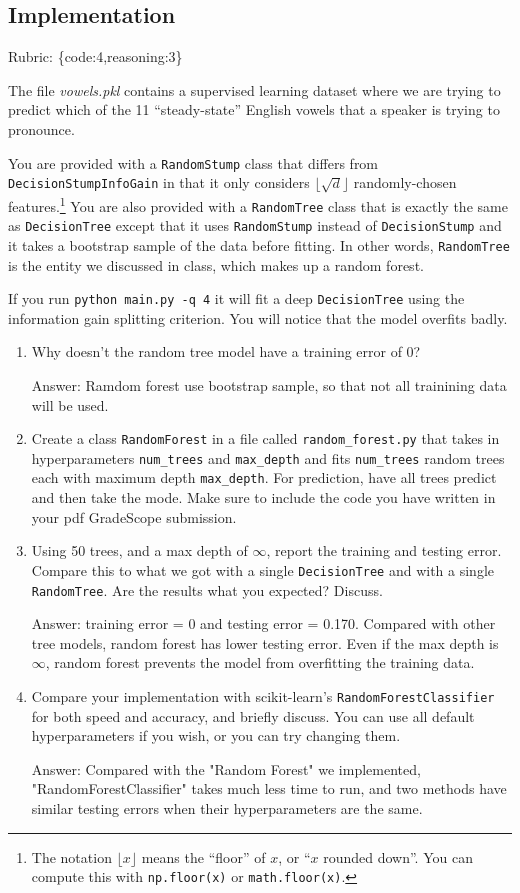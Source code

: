 \documentclass{article}
\def\rubric#1{\gre{Rubric: \{#1\}}}{}
\def\ans#1{\par\gre{Answer: #1}}
\def\blu#1{{\color{blu}#1}}
\def\gre#1{{\color{gre}#1}}
\def\enum#1{\begin{enumerate}#1\end{enumerate}}
\begin{document}
\subsection{Implementation}
\rubric{code:4,reasoning:3}

The file \emph{vowels.pkl} contains a supervised learning dataset where we are trying to predict which of the 11 ``steady-state'' English vowels that a speaker is trying to pronounce.

You are provided with a \texttt{RandomStump} class that differs from
\texttt{DecisionStumpInfoGain} in that
it only considers $\lfloor \sqrt{d} \rfloor$ randomly-chosen features.\footnote{The notation $\lfloor x\rfloor$ means the ``floor'' of $x$, or ``$x$ rounded down''. You can compute this with \texttt{np.floor(x)} or \texttt{math.floor(x)}.}
You are also provided with a \texttt{RandomTree} class that is exactly the same as
\texttt{DecisionTree} except that it uses \texttt{RandomStump} instead of
\texttt{DecisionStump} and it takes a bootstrap sample of the data before fitting.
In other words, \texttt{RandomTree} is the entity we discussed in class, which
makes up a random forest.

If you run \texttt{python main.py -q 4} it will fit a deep \texttt{DecisionTree}
using the information gain splitting criterion. You will notice that the model overfits badly.




\blu{
\enum{
\item Why doesn't the random tree model have a training error of 0?
\ans{Ramdom forest use bootstrap sample, so that not all trainining data will be used.}
\item Create a class \texttt{RandomForest} in a file called \texttt{random\string_forest.py} that takes in hyperparameters \texttt{num\string_trees} and \texttt{max\string_depth} and
fits \texttt{num\string_trees} random trees each with maximum depth \texttt{max\string_depth}. For prediction, have all trees predict and then take the mode. Make sure to include the code you have written in your pdf GradeScope submission.
\item Using 50 trees, and a max depth of $\infty$, report the training and testing error. Compare this to what we got with a single \texttt{DecisionTree} and with a single \texttt{RandomTree}. Are the results what you expected? Discuss.
\ans{training error = 0 and testing error = 0.170. Compared with other tree models, random forest has lower testing error. Even if the max depth is $\infty$, random forest prevents the model from overfitting the training data.}
\item Compare your implementation with scikit-learn's \texttt{RandomForestClassifier} for both speed and accuracy, and briefly discuss. You can use all default hyperparameters if you wish, or you can try changing them.
\ans {Compared with the "Random Forest" we implemented, "RandomForestClassifier" takes much less time to run, and two methods have similar testing errors when their hyperparameters are the same.}
}
}
\end{document}
